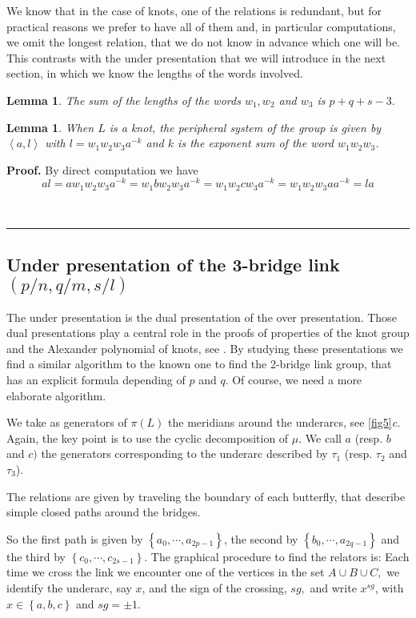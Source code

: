 \documentclass[12pt]{article}%
\newtheorem{lemma}[theorem]{Lemma}
\newenvironment{proof}[1][Proof]{\noindent\textbf{#1.} }{\ \rule{0.5em}{0.5em}}
\begin{document}
We know that in the case of knots, one of the relations is redundant, but for
practical reasons we prefer to have all of them and, in particular
computations, we omit the longest relation, that we do not know in advance
which one will be.$\ $This contrasts with the under presentation that we will
introduce in the next section, in which we know the lengths of the words involved.

\begin{lemma}
The sum of the lengths of the words $w_{1},w_{2}$ and $w_{3}$ is $p+q+s-3.$
\end{lemma}

\begin{lemma}
When $L$ is a knot, the peripheral system of the group is given by
$\left\langle a,l\right\rangle $ with $l=w_{1}w_{2}w_{3}a^{-k}$ and $k$ is the
exponent sum of the word $w_{1}w_{2}w_{3}$.
\end{lemma}

\begin{proof}
By direct computation we have
\[
al=aw_{1}w_{2}w_{3}a^{-k}=w_{1}bw_{2}w_{3}a^{-k}=w_{1}w_{2}cw_{3}a^{-k}%
=w_{1}w_{2}w_{3}aa^{-k}=la
\]

\end{proof}

\subsection{Under presentation of the 3-bridge link $\left(
p/n,q/m,s/l\right)  $}

The under presentation is the dual presentation of the over presentation.
Those dual presentations play a central role in the proofs of properties of
the knot group and the Alexander polynomial of knots, see \cite{CrFo}. By
studying these presentations we find a similar algorithm to the known one to
find the 2-bridge link group, that has an explicit formula depending of $p$
and $q$. Of course, we need a more elaborate algorithm.

We take as generators of $\pi\left(  L\right)  $ the meridians around the
underarcs, see \ref{fig5}\textit{c. }Again, the key point is to use the cyclic
decomposition of $\mu$. We call $a$ (resp. $b$ and $c)$ the generators
corresponding to the underarc described by $\tau_{1}$ (resp. $\tau_{2}$ and
$\tau_{3}$).

The relations are given by traveling the boundary of each butterfly, that
describe simple closed paths around the bridges.

So the first path is given by $\left\{  a_{0},\cdots,a_{2p-1}\right\}  $, the
second by $\left\{  b_{0},\cdots,a_{2q-1}\right\}  $ and the third by
$\left\{  c_{0},\cdots,c_{2s-1}\right\}  $. The graphical procedure to find
the relators is: Each time we cross the link we encounter one of the vertices
in the set $A\cup B\cup C,$ we identify the underarc, say $x$, and the sign of
the crossing, $sg,$ and write $x^{sg}$, with $x\in\left\{  a,b,c\right\}  $
and $sg=\pm1$.
\end{document}
